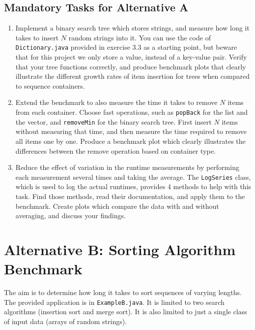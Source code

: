 \documentclass[a4paper,10pt]{article}
\begin{document}
\subsection{Mandatory Tasks for Alternative A}\label{sec:task1a}

\begin{enumerate}

\item
Implement a binary search tree which stores strings, and measure how long it takes to insert $N$ random strings into it.
You can use the code of \texttt{Dictionary.java} provided in exercise 3.3 as a starting point, but beware that for this project we only store a value, instead of a key-value pair.
Verify that your tree functions correctly, and produce benchmark plots that clearly illustrate the different growth rates of item insertion for trees when compared to sequence containers.

\item
Extend the benchmark to also measure the time it takes to remove $N$ items from each container.
Choose fast operations, such as \texttt{popBack} for the list and the vector, and \texttt{removeMin} for the binary search tree.
First insert $N$ items without measuring that time, and then measure the time required to remove all items one by one.
Produce a benchmark plot which clearly illustrates the differences between the remove operation based on container type.

\item
  Reduce the effect of variation in the runtime measurements by performing each measurement several times and taking the average.
  The \texttt{LogSeries} class, which is used to log the actual runtimes, provides 4 methods to help with this task.
  Find those methods, read their documentation, and apply them to the benchmark.
  Create plots which compare the data with and without averaging, and discuss your findings.

\end{enumerate}



\section{Alternative B: Sorting Algorithm Benchmark}

The aim is to determine how long it takes to sort sequences of varying lengths.
The provided application is in \texttt{ExampleB.java}.
It is limited to two search algorithms (insertion sort and merge sort).
It is also limited to just a single class of input data (arrays of random strings).
\end{document}
